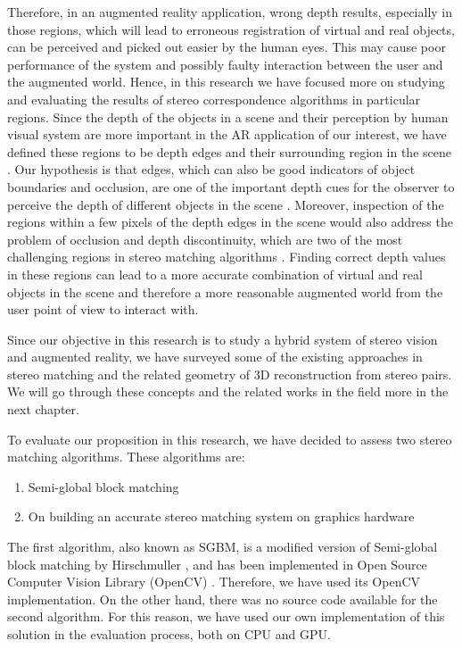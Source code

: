 \documentclass[12pt]{report}
\begin{document}
Therefore, in an augmented reality application, wrong depth results, especially in those regions, which will lead to erroneous registration of virtual and real objects, 
can be perceived and picked out easier by the human eyes. This may cause poor performance of the system and possibly faulty interaction between 
the user and the augmented world. 
Hence, in this research we have focused more on studying and evaluating the results of stereo correspondence algorithms in particular regions. Since the depth of the objects 
in a scene and their perception by human visual system are more important in the AR application of our interest, we have 
defined these regions to be depth edges and their surrounding region in the scene \cite{liv05,kru10}.
Our hypothesis is that edges, which can also be good indicators of object boundaries and occlusion, are one of the important depth cues for the observer 
to perceive the depth of different objects in the scene \cite{sze11}. 
Moreover, inspection of the regions within a few pixels of the depth edges in the scene would also address the problem of occlusion and depth discontinuity, which are two of
the most challenging regions in stereo matching algorithms \cite{sch02}.
Finding correct depth values in these 
regions can lead to a more accurate combination of virtual and real objects in the scene and therefore a more reasonable augmented world from the user point of view to interact with. \newline
\newline

Since our objective in this research is to study a hybrid system of stereo vision and augmented reality, we have surveyed some of the existing approaches in stereo matching and the
related geometry of 3D reconstruction from stereo pairs. We will go through these concepts and the related works in the field more in the next chapter. 

To evaluate our proposition in this research, we have decided to assess two stereo matching algorithms. These algorithms are:
\begin{enumerate}
\item Semi-global block matching
\item On building an accurate stereo matching system on graphics hardware \cite{mei11}
\end{enumerate}

The first algorithm, also known as SGBM, is a modified version of Semi-global block matching by Hirschmuller \cite{hir08}, 
and has been implemented in Open Source Computer Vision Library (OpenCV) \cite{sgbm}. Therefore, we have used its OpenCV implementation. 
On the other hand, there was no source code available for the second algorithm. For this reason, we have used our own implementation of this solution in the evaluation process, both on CPU and GPU.
\end{document}
